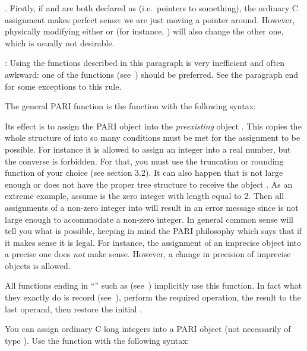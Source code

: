 .
Firstly, if  and  are both declared as  (i.e.~pointers
to something), the ordinary C assignment  makes perfect sense: we
are just moving a pointer around. However, physically modifying either
 or  (for instance, ) will also change the other
one, which is usually not desirable. \label{se:assign}

: Using the functions described in this
paragraph is very inefficient and often awkward: one of the 
functions (see~) should be preferred. See the paragraph
end for some exceptions to this rule.

\noindent
The general PARI  function is the function  with
the following syntax:


\noindent
Its effect is to assign the PARI object  into the \emph{preexisting}
object . This copies the whole structure of  into  so
many conditions must be met for the assignment to be possible. For instance
it is allowed to assign an integer into a real number, but the converse is
forbidden.  For that, you must use the truncation or rounding function of
your choice (see section 3.2). It can also happen that  is not large
enough or does not have the proper tree structure to receive the object
. As an extreme example, assume  is the zero integer with length
equal to 2. Then all assignments of a non-zero integer into  will
result in an error message since  is not large enough to accommodate
a non-zero integer.  In general common sense will tell you what is possible,
keeping in mind the PARI philosophy which says that if it makes sense it is
legal. For instance, the assignment of an imprecise object into a precise one
does \emph{not} make sense. However, a change in precision of imprecise
objects is allowed.

All functions ending in ``'' such as 
(see~) implicitly use this function. In fact what they
exactly do is record {} (see~), perform the
required operation,  the result to the last operand, then
restore the initial .

You can assign ordinary C long integers into a PARI object (not necessarily
of type ). Use the function  with the following
syntax:

